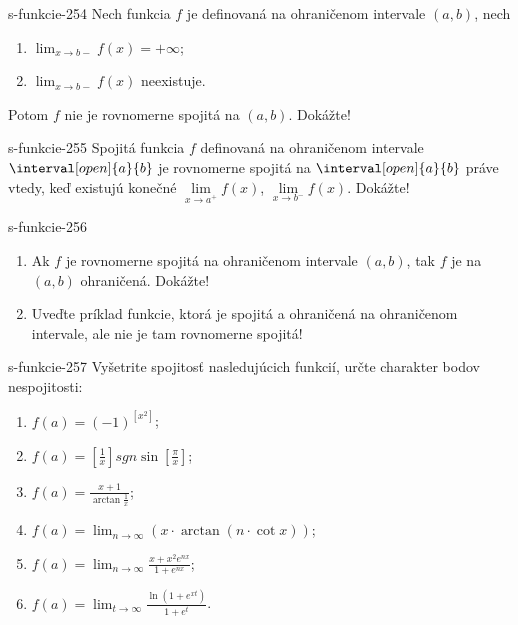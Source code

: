 \begin{defproblem}{s-funkcie-254}
  Nech funkcia $f$ je definovaná na ohraničenom intervale $(a,b)$, nech
  \begin{enumerate}
  \item $\lim_{x \rightarrow b-}f(x)=+\infty$;
  \item $\lim_{x \rightarrow b-}f(x)$ neexistuje.
  \end{enumerate}
  Potom $f$ nie je rovnomerne spojitá na $(a,b)$. Dokážte!
\end{defproblem}

\begin{defproblem}{s-funkcie-255}
  Spojitá funkcia $f$ definovaná na ohraničenom intervale
  $\interval[open]{a}{b}$ je rovnomerne spojitá na $\interval[open]{a}{b}$
  práve vtedy, keď existujú konečné
  $\lim\limits_{x \rightarrow a^+}f(x)$, $\lim\limits_{x \rightarrow b^-}f(x)$. Dokážte!
\end{defproblem}

\begin{defproblem}{s-funkcie-256}
\begin{enumerate}
\item Ak $f$ je rovnomerne spojitá na ohraničenom intervale $(a,b)$, tak $f$ je na $(a,b)$ ohraničená. Dokážte!
  \item Uveďte príklad funkcie, ktorá je spojitá a ohraničená na ohraničenom intervale, ale nie je tam rovnomerne spojitá!
\end{enumerate}
\end{defproblem}

\begin{defproblem}{s-funkcie-257}
Vyšetrite spojitosť nasledujúcich funkcií, určte charakter bodov nespojitosti:
\begin{enumerate}
\item $f(a)=(-1)^{[x^2]}$;
\item $f(a)=[\frac{1}{x}] sgn \sin [\frac{\pi}{x}]$;
\item $f(a)=\frac{x+1}{\arctan\frac{1}{x}}$;
\item $f(a)=\lim_{n \rightarrow \infty} (x \cdot \arctan(n \cdot \cot x))$;
\item $f(a)=\lim_{n \rightarrow \infty} \frac{x+x^2e^{nx}}{1+e^{nx}}$;
\item $f(a)=\lim_{t \rightarrow \infty}\frac{\ln (1+e^{xt})}{1+e^t}$.
\end{enumerate}
\end{defproblem}

